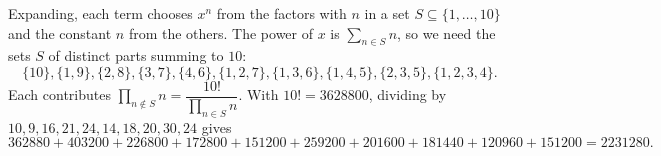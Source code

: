 Expanding, each term chooses $x^n$ from the factors with $n$ in a set $S\subseteq\{1,\dots,10\}$ and the constant $n$ from the others. The power of $x$ is $\sum_{n\in S}n$, so we need the sets $S$ of distinct parts summing to $10$:
\[\{10\},\{1,9\},\{2,8\},\{3,7\},\{4,6\},\{1,2,7\},\{1,3,6\},\{1,4,5\},\{2,3,5\},\{1,2,3,4\}.\]
Each contributes $\prod_{n\notin S}n=\dfrac{10!}{\prod_{n\in S}n}$. With $10!=3628800$, dividing by $10,9,16,21,24,14,18,20,30,24$ gives
\[362880+403200+226800+172800+151200+259200+201600+181440+120960+151200=\boxed{2231280}.\]
